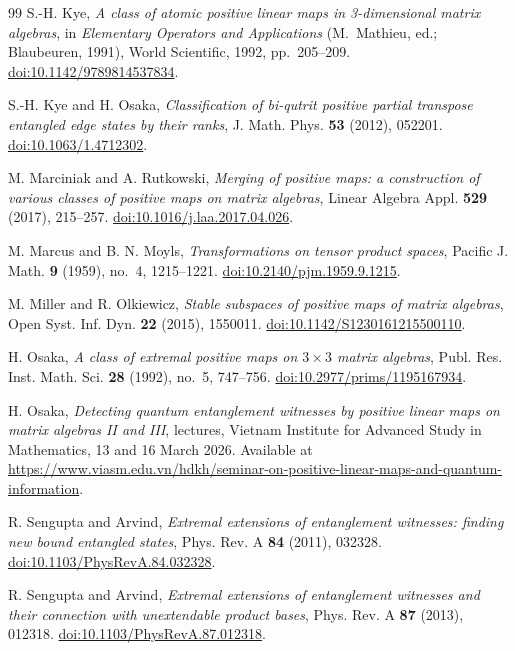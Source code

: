 \documentclass[11pt]{amsart}
\newcommand{\chg}[1]{#1}
\newcommand{\newrev}[1]{#1}
\theoremstyle{plain}
\theoremstyle{definition}
\theoremstyle{remark}
\begin{document}
\begin{thebibliography}{99}
S.-H. Kye,
\emph{A class of atomic positive linear maps in 3-dimensional matrix algebras},
in \emph{Elementary Operators and Applications} \newrev{(M.~Mathieu, ed.; Blaubeuren, 1991)}, World Scientific, 1992, pp.~205--209.
\href{https://doi.org/10.1142/9789814537834}{doi:10.1142/9789814537834}.

S.-H. Kye and H. Osaka,
\emph{Classification of bi-qutrit positive partial transpose entangled edge states by their ranks},
J. Math. Phys. \textbf{53} (2012), 052201.
\href{https://doi.org/10.1063/1.4712302}{doi:10.1063/1.4712302}.

M. Marciniak and A. Rutkowski,
\emph{Merging of positive maps: a construction of various classes of positive maps on matrix algebras},
Linear Algebra Appl. \textbf{529} (2017), 215--257.
\href{https://doi.org/10.1016/j.laa.2017.04.026}{doi:10.1016/j.laa.2017.04.026}.

M. Marcus and B. N. Moyls,
\emph{Transformations on tensor product spaces},
Pacific J. Math. \textbf{9} (1959), no.~4, 1215--1221.
\href{https://doi.org/10.2140/pjm.1959.9.1215}{doi:10.2140/pjm.1959.9.1215}.

M. Miller and R. Olkiewicz,
\emph{Stable subspaces of positive maps of matrix algebras},
Open Syst. Inf. Dyn. \textbf{22} (2015), 1550011.
\href{https://doi.org/10.1142/S1230161215500110}{doi:10.1142/S1230161215500110}.

H. Osaka,
\emph{A class of extremal positive maps on $3\times3$ matrix algebras},
Publ. Res. Inst. Math. Sci. \textbf{28} (1992), no.~5, 747--756.
\href{https://doi.org/10.2977/prims/1195167934}{doi:10.2977/prims/1195167934}.

H. Osaka,
\emph{Detecting quantum entanglement witnesses by positive linear maps on matrix algebras II and III},
lectures, Vietnam Institute for Advanced Study in Mathematics, 13 and 16 March 2026.
\chg{Available at \url{https://www.viasm.edu.vn/hdkh/seminar-on-positive-linear-maps-and-quantum-information}.}

R. Sengupta and Arvind,
\emph{Extremal extensions of entanglement witnesses: finding new bound entangled states},
Phys. Rev. A \textbf{84} (2011), 032328.
\href{https://doi.org/10.1103/PhysRevA.84.032328}{doi:10.1103/PhysRevA.84.032328}.

R. Sengupta and Arvind,
\emph{Extremal extensions of entanglement witnesses and their connection with unextendable product bases},
Phys. Rev. A \textbf{87} (2013), 012318.
\href{https://doi.org/10.1103/PhysRevA.87.012318}{doi:10.1103/PhysRevA.87.012318}.


\end{thebibliography}
\end{document}
